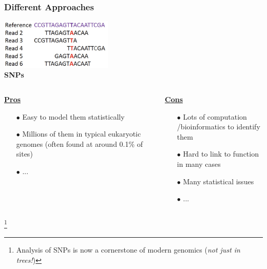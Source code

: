 \documentclass{beamer}
\newcommand\blfootnote[1]{%
	\begingroup
	\renewcommand\thefootnote{}\footnote{#1}%
	\addtocounter{footnote}{-1}%
	\endgroup
}
\begin{document}
\begin{frame}
	\frametitle{Different Approaches}
	
	\centering 	\includegraphics[keepaspectratio, width  = 0.4\textwidth]{img/readDiagram}\\
	\vspace{10pt}
	\centering \textbf{		\Large SNPs }
	\vspace{10pt}
	\begin{columns}
		\begin{column}{0.5\textwidth}
			\centering			\underline{\textbf{Pros}}
			\begin{itemize}
				\item[$\bullet$] Easy to model them statistically
				\item[$\bullet$] Millions of them in typical eukaryotic genomes (often found at around 0.1\% of sites)
				\item[$\bullet$] ... 
			\end{itemize}
		\end{column}
		\begin{column}{0.5\textwidth}
			\centering			\underline{\textbf{Cons}}
			\begin{itemize}
				\item[$\bullet$] Lots of computation /bioinformatics to identify them
				\item[$\bullet$] Hard to link to function in many cases
				\item[$\bullet$] Many statistical issues
				\item[$\bullet$] ... 
			\end{itemize}
		\end{column}
	\end{columns}
	
	\blfootnote{Analysis of SNPs is now a cornerstone of modern genomics (\textit{not just in trees!})}
\end{frame}
\end{document}
